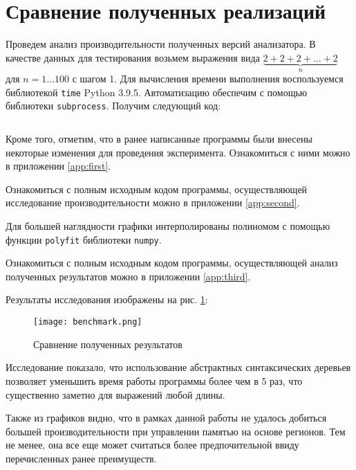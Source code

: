 \section{Сравнение полученных реализаций}
Проведем анализ производительности полученных версий анализатора. В
качестве данных для тестирования возьмем выражения вида \(\underbrace{2 + 2 + 2 + \dots + 2}_{n}\)
для \(n = 1 \dots 100\) с шагом 1. Для вычисления времени выполнения воспользуемся библиотекой \verb|time| Python 3.9.5. Автоматизацию обеспечим с помощью
библиотеки \verb|subprocess|. Получим следующий код:

\inputminted{python}{test.py}

Кроме того, отметим, что в ранее написанные программы были внесены некоторые изменения для проведения эксперимента. Ознакомиться с ними
можно в приложении \ref{app:first}.

Ознакомиться с полным исходным кодом программы, осуществляющей
исследование производительности можно в приложении \ref{app:second}.

Для большей наглядности графики интерполированы полиномом с помощью функции \verb|polyfit| библиотеки \verb|numpy|.

Ознакомиться с полным исходным кодом программы, осуществляющей
анализ полученных результатов можно в приложении \ref{app:third}.

Результаты исследования изображены на рис. \ref{fig:seven}:

\begin{figure}[H]
    \centering
    \texttt{[image: benchmark.png]}
    \caption{Сравнение полученных результатов}
    \label{fig:seven}
\end{figure}

Исследование показало, что использование абстрактных синтаксических
деревьев позволяет уменьшить время работы программы более чем в 5 раз, что
существенно заметно для выражений любой длины.

Также из графиков видно, что в рамках данной работы не удалось добиться большей производительности при управлении памятью на основе регионов.
Тем не менее, она все еще может считаться более предпочительной ввиду перечисленных ранее преимуществ.
